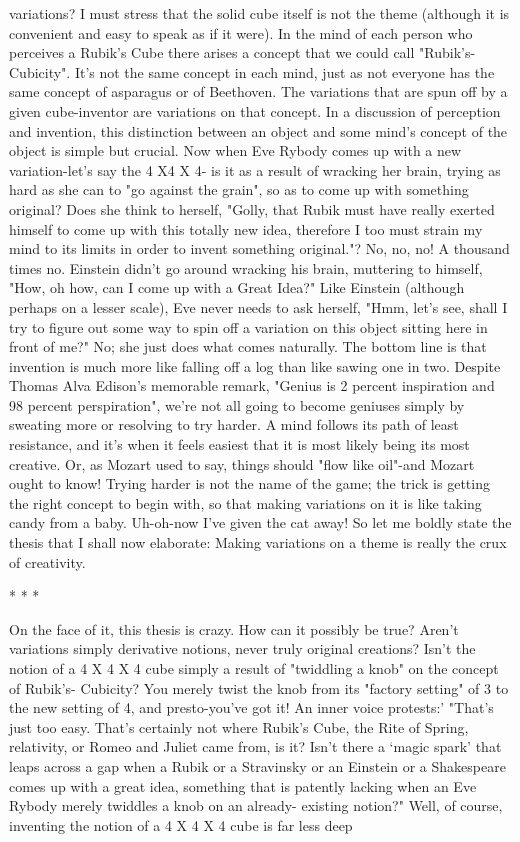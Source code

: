 variations? I must stress that the solid cube itself is not the theme (although it is
convenient and easy to speak as if it were). In the mind of each person who perceives
a Rubik's Cube there arises a concept that we could call "Rubik's-Cubicity". It's not
the same concept in each mind, just as not everyone has the same concept of
asparagus or of Beethoven. The variations that are spun off by a given cube-inventor
are variations on that concept. In a discussion of perception and invention, this
distinction between an object and some mind's concept of the object is simple but
crucial.
         Now when Eve Rybody comes up with a new variation-let's say the 4 X4 X 4-
is it as a result of wracking her brain, trying as hard as she can to "go against the
grain", so as to come up with something original? Does she think to herself, "Golly,
that Rubik must have really exerted himself to come up with this totally new idea,
therefore I too must strain my mind to its limits in order to invent something
original."? No, no, no! A thousand times no. Einstein didn't go around wracking his
brain, muttering to himself, "How, oh how, can I come up with a Great Idea?" Like
Einstein (although perhaps on a lesser scale), Eve never needs to ask herself, "Hmm,
let's see, shall I try to figure out some way to spin off a variation on this object sitting
here in front of me?" No; she just does what comes naturally.
         The bottom line is that invention is much more like falling off a log than like
sawing one in two. Despite Thomas Alva Edison's memorable remark, "Genius is 2
percent inspiration and 98 percent perspiration", we're not all going to become
geniuses simply by sweating more or resolving to try harder. A mind follows its path
of least resistance, and it's when it feels easiest that it is most likely being its most
creative. Or, as Mozart used to say, things should "flow like oil"-and Mozart ought to
know! Trying harder is not the name of the game; the trick is getting the right concept
to begin with, so that making variations on it is like taking candy from a baby.
         Uh-oh-now I've given the cat away! So let me boldly state the thesis that I
shall now elaborate: Making variations on a theme is really the crux of creativity.

                                         *   *   *

        On the face of it, this thesis is crazy. How can it possibly be true? Aren't
variations simply derivative notions, never truly original creations? Isn't the notion of
a 4 X 4 X 4 cube simply a result of "twiddling a knob" on the concept of Rubik's-
Cubicity? You merely twist the knob from its "factory setting" of 3 to the new setting
of 4, and presto-you've got it! An inner voice protests:' "That's just too easy. That's
certainly not where Rubik's Cube, the Rite of Spring, relativity, or Romeo and Juliet
came from, is it? Isn't there a `magic spark' that leaps across a gap when a Rubik or a
Stravinsky or an Einstein or a Shakespeare comes up with a great idea, something that
is patently lacking when an Eve Rybody merely twiddles a knob on an already-
existing notion?"
Well, of course, inventing the notion of a 4 X 4 X 4 cube is far less deep




